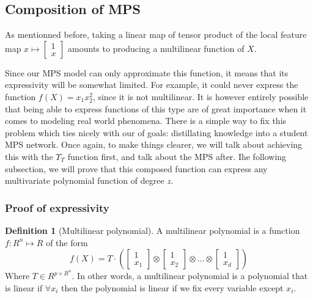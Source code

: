 \documentclass{article}
\theoremstyle{definition}
\newtheorem{definition}{Definition}[section]
\theoremstyle{definition}
\begin{document}
\subsection{Composition of MPS}
As mentionned before, taking a linear map of  tensor product of the local feature map 
$ x \mapsto \begin{bmatrix} 1 \\ x \end{bmatrix} $ amounts to producing a multilinear function of $X$.

Since our MPS model can only approximate this function, it means that its expressivity
will be somewhat limited. For example, it could never express the function $f(X) = x_1x_2^2$, since it is not multilinear. It is however entirely possible that being able to express functions of this type are of great importance when it comes to modeling real world phenomena. There is a simple way to fix this problem which ties nicely with our of goals: distillating knowledge into a student MPS network. Once again, to make things clearer, we will talk about achieving this with the $\Upsilon_{T}$ function first, and talk about the MPS after. Ihe following subsection, we will prove that this composed function can express
any multivariate polynomial function of degree $z$.

\subsubsection{Proof of expressivity}
\begin{definition}[Multilinear polynomial]
    A multilinear polynomial is a function $f: R^n \mapsto R$ of the form
    \begin{equation}
        f(X) = T \cdot \left( 
            \begin{bmatrix} 1 \\ x_1 \end{bmatrix} \otimes 
            \begin{bmatrix} 1 \\ x_2 \end{bmatrix} \otimes 
            \dots \otimes 
            \begin{bmatrix} 1 \\ x_d \end{bmatrix}
        \right)
    \end{equation}
    Where $T \in R^{p \times R^n }$. In other words, a multilinear polynomial is a polynomial that is linear if  $\forall x_i$ then the polynomial is linear if we fix every variable except $x_i$.
\end{definition}
\end{document}
